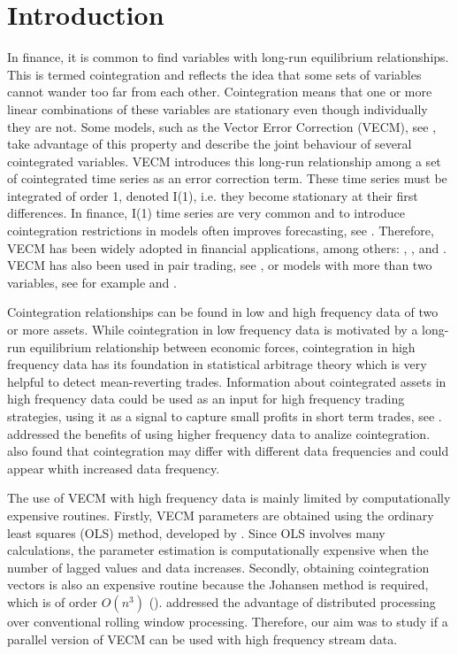 \section{Introduction}
In finance, it is common to find variables with long-run equilibrium
relationships. This is termed cointegration and reflects the idea that some sets
of variables cannot wander too far from each other. Cointegration means that one
or more linear combinations of these variables are stationary even though
individually they are not. Some models, such as the Vector Error Correction
(VECM), see \cite{engle87}, take advantage of this property and describe the
joint behaviour of several cointegrated variables. VECM introduces this long-run
relationship among a set of cointegrated time series as an error correction
term. These time series must be integrated of order 1, denoted I(1), i.e. they
become stationary at their first differences. In finance, I(1) time series are
very common and to introduce cointegration restrictions in models often improves
forecasting, see \cite{duy1998}. Therefore, VECM has been widely adopted in
financial applications, among others: \cite{mukherjee1995}, \cite{seong2013},
\cite{maysami2000} and \cite{arestis2001}. VECM has also been used in pair
trading, see \cite{herlemont2003}, or models with more than two variables, see
for example \cite{mukherjee1995} and \cite{engle2004}.

Cointegration relationships can be found in low and high frequency data of two or
more assets. While cointegration in low frequency data is motivated by a
long-run equilibrium relationship between economic forces, cointegration in high
frequency data has its foundation in statistical arbitrage theory which is very helpful
to detect mean-reverting trades. Information about cointegrated assets in high
frequency data could be used as an input for high frequency trading strategies,
using it as a signal to capture small profits in short term trades, see
\cite{miao2014}. \cite{zhou2001} addressed the benefits of using higher
frequency data to analize cointegration. \cite{rittler2012} also found that
cointegration may differ with different data frequencies and could appear
whith increased data frequency.

The use of VECM with high frequency data is mainly limited by computationally
expensive routines. Firstly, VECM parameters are obtained using the ordinary
least squares (OLS) method, developed by \cite{golub1980}. Since OLS involves
many calculations, the parameter estimation is computationally expensive when
the number of lagged values and data increases. Secondly, obtaining
cointegration vectors is also an expensive routine because the Johansen method 
is required, which is of order $O(n^3)$ (\cite{johansen1995}).
\cite{chen2003} addressed the advantage of distributed processing over
conventional rolling window processing. Therefore, our aim was to study if a
parallel version of VECM can be used with high frequency stream data. 

